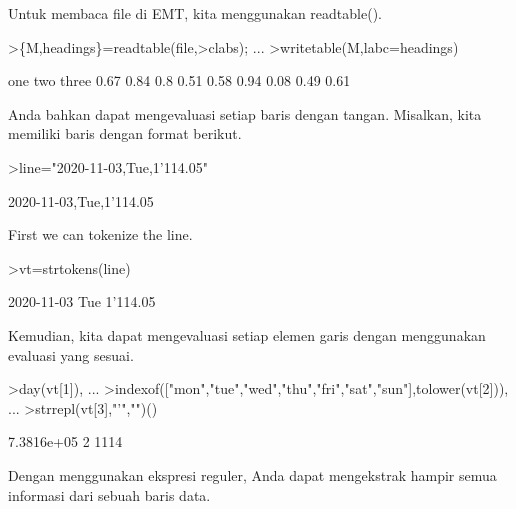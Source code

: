 \documentclass[a4paper,10pt]{article}
\begin{document}
\begin{eulernotebook}
\begin{eulercomment}
\begin{eulercomment}
\begin{eulercomment}
\begin{eulercomment}
\begin{eulercomment}
\begin{eulercomment}
\begin{eulercomment}
\begin{eulercomment}
\begin{eulercomment}
\begin{eulercomment}
\begin{eulercomment}
\begin{eulercomment}
\begin{eulercomment}
\begin{eulercomment}
\begin{eulercomment}
\begin{eulercomment}
\begin{eulercomment}
\begin{eulercomment}
\begin{eulercomment}
\begin{eulercomment}
\begin{eulercomment}
\begin{eulercomment}
\begin{eulercomment}
\begin{eulercomment}
\begin{eulercomment}
Untuk membaca file di EMT, kita menggunakan readtable().
\end{eulercomment}
\begin{eulerprompt}
>\{M,headings\}=readtable(file,>clabs); ...
>writetable(M,labc=headings)
\end{eulerprompt}
\begin{euleroutput}
         one       two     three
        0.67      0.84       0.8
        0.51      0.58      0.94
        0.08      0.49      0.61
\end{euleroutput}
\begin{eulercomment}
Anda bahkan dapat mengevaluasi setiap baris dengan tangan. Misalkan,
kita memiliki baris dengan format berikut.
\end{eulercomment}
\begin{eulerprompt}
>line="2020-11-03,Tue,1'114.05"
\end{eulerprompt}
\begin{euleroutput}
  2020-11-03,Tue,1'114.05
\end{euleroutput}
\begin{eulercomment}
First we can tokenize the line.
\end{eulercomment}
\begin{eulerprompt}
>vt=strtokens(line)
\end{eulerprompt}
\begin{euleroutput}
  2020-11-03
  Tue
  1'114.05
\end{euleroutput}
\begin{eulercomment}
Kemudian, kita dapat mengevaluasi setiap elemen garis dengan
menggunakan evaluasi yang sesuai.
\end{eulercomment}
\begin{eulerprompt}
>day(vt[1]),  ...
>indexof(["mon","tue","wed","thu","fri","sat","sun"],tolower(vt[2])),  ...
>strrepl(vt[3],"'","")()
\end{eulerprompt}
\begin{euleroutput}
  7.3816e+05
  2
  1114
\end{euleroutput}
\begin{eulercomment}
Dengan menggunakan ekspresi reguler, Anda dapat mengekstrak hampir
semua informasi dari sebuah baris data.


\end{eulercomment}
\end{eulercomment}
\end{eulercomment}
\end{eulercomment}
\end{eulercomment}
\end{eulercomment}
\end{eulercomment}
\end{eulercomment}
\end{eulercomment}
\end{eulercomment}
\end{eulercomment}
\end{eulercomment}
\end{eulercomment}
\end{eulercomment}
\end{eulercomment}
\end{eulercomment}
\end{eulercomment}
\end{eulercomment}
\end{eulercomment}
\end{eulercomment}
\end{eulercomment}
\end{eulercomment}
\end{eulercomment}
\end{eulercomment}
\end{eulercomment}
\end{eulernotebook}
\end{document}
